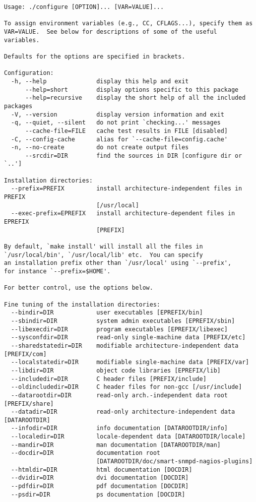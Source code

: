\begin{verbatim}
Usage: ./configure [OPTION]... [VAR=VALUE]...

To assign environment variables (e.g., CC, CFLAGS...), specify them as
VAR=VALUE.  See below for descriptions of some of the useful variables.

Defaults for the options are specified in brackets.

Configuration:
  -h, --help              display this help and exit
      --help=short        display options specific to this package
      --help=recursive    display the short help of all the included packages
  -V, --version           display version information and exit
  -q, --quiet, --silent   do not print `checking...' messages
      --cache-file=FILE   cache test results in FILE [disabled]
  -C, --config-cache      alias for `--cache-file=config.cache'
  -n, --no-create         do not create output files
      --srcdir=DIR        find the sources in DIR [configure dir or `..']

Installation directories:
  --prefix=PREFIX         install architecture-independent files in PREFIX
                          [/usr/local]
  --exec-prefix=EPREFIX   install architecture-dependent files in EPREFIX
                          [PREFIX]

By default, `make install' will install all the files in
`/usr/local/bin', `/usr/local/lib' etc.  You can specify
an installation prefix other than `/usr/local' using `--prefix',
for instance `--prefix=$HOME'.

For better control, use the options below.

Fine tuning of the installation directories:
  --bindir=DIR            user executables [EPREFIX/bin]
  --sbindir=DIR           system admin executables [EPREFIX/sbin]
  --libexecdir=DIR        program executables [EPREFIX/libexec]
  --sysconfdir=DIR        read-only single-machine data [PREFIX/etc]
  --sharedstatedir=DIR    modifiable architecture-independent data [PREFIX/com]
  --localstatedir=DIR     modifiable single-machine data [PREFIX/var]
  --libdir=DIR            object code libraries [EPREFIX/lib]
  --includedir=DIR        C header files [PREFIX/include]
  --oldincludedir=DIR     C header files for non-gcc [/usr/include]
  --datarootdir=DIR       read-only arch.-independent data root [PREFIX/share]
  --datadir=DIR           read-only architecture-independent data [DATAROOTDIR]
  --infodir=DIR           info documentation [DATAROOTDIR/info]
  --localedir=DIR         locale-dependent data [DATAROOTDIR/locale]
  --mandir=DIR            man documentation [DATAROOTDIR/man]
  --docdir=DIR            documentation root
                          [DATAROOTDIR/doc/smart-snmpd-nagios-plugins]
  --htmldir=DIR           html documentation [DOCDIR]
  --dvidir=DIR            dvi documentation [DOCDIR]
  --pdfdir=DIR            pdf documentation [DOCDIR]
  --psdir=DIR             ps documentation [DOCDIR]


\end{verbatim}
